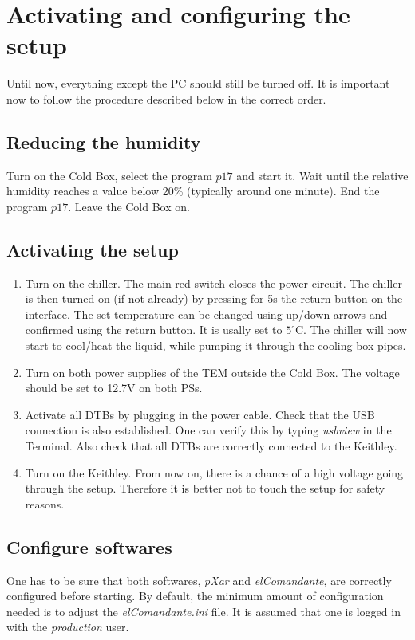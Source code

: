 \documentclass[fleqn,10pt]{SelfArx} %
\begin{document}
\section{Activating and configuring the setup}
Until now, everything except the PC should still be turned off. It is important now to follow the procedure described below in the correct order. 

\subsection{Reducing the humidity}
Turn on the Cold Box, select the program $p17$ and start it. Wait until the relative humidity reaches a value below 20\% (typically around one minute). End the program $p17$. Leave the Cold Box on.

\subsection{Activating the setup}
\begin{enumerate}
\item Turn on the chiller. The main red switch closes the power circuit. The chiller is then turned on (if not already) by pressing for 5s the return button on the interface. The set temperature can be changed using up/down arrows and confirmed using the return button. It is usally set to $5^\circ$C. The chiller will now start to cool/heat the liquid, while pumping it through the cooling box pipes. 
\item Turn on both power supplies of the TEM outside the Cold Box. The voltage should be set to 12.7V on both PSs. 
\item Activate all DTBs by plugging in the power cable. Check that the USB connection is also established. One can verify this by typing {\it usbview} in the Terminal. Also check that all DTBs are correctly connected to the Keithley. 
\item Turn on the Keithley. From now on, there is a chance of a high voltage going through the setup. Therefore it is better not to touch the setup for safety reasons. 
\end{enumerate}

\subsection{Configure softwares}
One has to be sure that both softwares, {\it pXar} and {\it elComandante}, are correctly configured before starting. By default, the minimum amount of configuration needed is to adjust the {\it elComandante.ini} file. It is assumed that one is logged in with the {\it production} user.
\end{document}
